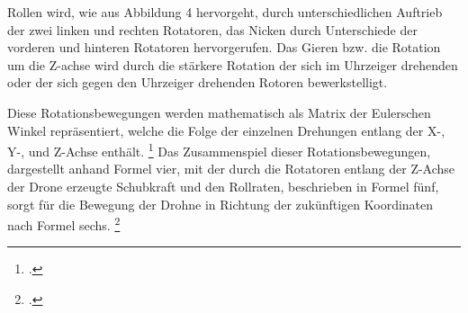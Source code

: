 Rollen wird, wie aus Abbildung 4 hervorgeht, durch unterschiedlichen Auftrieb der zwei linken und rechten Rotatoren, das Nicken durch Unterschiede der vorderen und hinteren Rotatoren hervorgerufen.
Das Gieren bzw. die Rotation um die Z-achse wird durch die stärkere Rotation der sich im Uhrzeiger drehenden oder der sich gegen den Uhrzeiger drehenden Rotoren bewerkstelligt. 

Diese Rotationsbewegungen werden mathematisch als Matrix der Eulerschen Winkel repräsentiert, welche die Folge der einzelnen Drehungen entlang der X-, Y-, und Z-Achse enthält. \footcite[Vgl.][S. 3]{Deshpande.2020}
Das Zusammenspiel dieser Rotationsbewegungen, dargestellt anhand Formel vier, mit der durch die Rotatoren entlang der Z-Achse der Drone erzeugte Schubkraft und den Rollraten, beschrieben in Formel fünf, sorgt für die Bewegung der Drohne in Richtung der zukünftigen Koordinaten nach Formel sechs. \footcite[Vgl.][S. 2]{Deshpande.2021}


